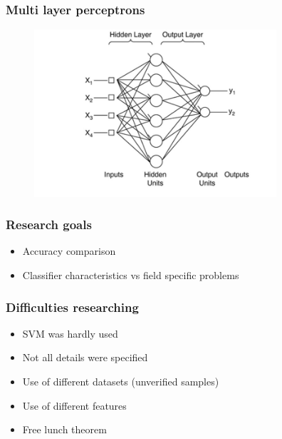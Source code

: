 \documentclass{beamer}
\begin{document}

\begin{frame}
\frametitle{Multi layer perceptrons}

	\begin{figure}
		\centering
    	\includegraphics[width=90mm,scale=1]{./img/MLP.jpg}
	\end{figure}

\end{frame}



\begin{frame}
\frametitle{Research goals}

	\begin{itemize}
		\item Accuracy comparison
		\item Classifier characteristics vs field specific problems
	 \end{itemize}
	 
\end{frame}


\begin{frame}
\frametitle{Difficulties researching}

	\begin{itemize}
		\item SVM was hardly used
		\item Not all details were specified
		\item Use of different datasets (unverified samples)
		\item Use of different features
		\item Free lunch theorem	 
	\end{itemize}

\end{frame}
\end{document}
